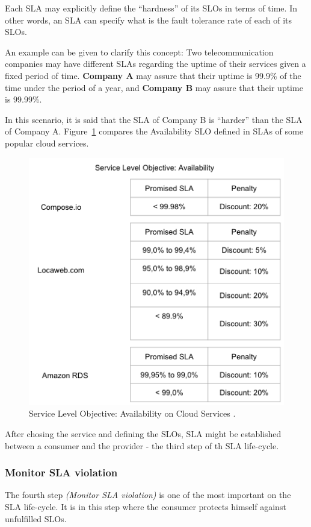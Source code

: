 Each SLA may explicitly define the ``hardness'' of its SLOs in terms of time. In other words, an SLA can specify what is the fault tolerance rate of each of its SLOs. 

An example can be given to clarify this concept: Two telecommunication companies may have different SLAs regarding the uptime of their services given a fixed period of time. \textbf{Company A} may assure that their uptime is 99.9\% of the time under the period of a year, and \textbf{Company B} may assure that their uptime is 99.99\%. 

In this scenario, it is said that the SLA of Company B is ``harder'' than the SLA of Company A. Figure~\ref{fig:sla-agreement} compares the Availability SLO defined in SLAs of some popular cloud services.

\begin{figure}[ht!]
\centering
\includegraphics[width=120mm]{slo-cloudServices.png}
\caption{Service Level Objective: Availability on Cloud Services \cite{locawebsla}\cite{composesla}\cite{amazonrdssla}.}\label{fig:sla-agreement}
\end{figure}

After chosing the service and defining the SLOs, SLA might be established between a consumer and the provider - the third step of th SLA life-cycle. 

\subsubsection{Monitor SLA violation}
The fourth step \textit{(Monitor SLA violation)} is one of the most important on the SLA life-cycle. It is in this step where the consumer protects himself against unfulfilled SLOs. 


